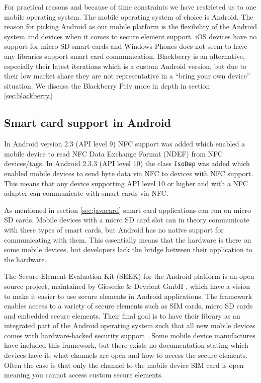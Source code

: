 For practical reasons and because of time constraints we have restricted us to one mobile operating system. The mobile operating system of choice is Android. The reason for picking Android as our mobile platform is the flexibility of the Android system and devices when it comes to secure element support. iOS devices have no support for micro SD smart cards and Windows Phones does not seem to have any libraries support smart card communication. Blackberry is an alternative, especially their latest iterations which is a custom Android version, but due to their low market share they are not representative in a ``bring your own device'' situation. We discuss the Blackberry Priv more in depth in section \ref{sec:blackberry.}


\subsection{Smart card support in Android}
\label{sec:supportAndroid}
In Android version 2.3 (API level 9) NFC support was added which enabled a mobile device to read NFC Data Exchange Format (NDEF) from NFC devices/tags. In Android 2.3.3 (API level 10) the class \texttt{IsoDep} was added which enabled mobile devices to send byte data via NFC to devices with NFC support. This means that any device supporting API level 10 or higher and with a NFC adapter can communicate with smart cards via NFC.

As mentioned in section \ref{sec:javacard} smart card applications can run on micro SD cards. Mobile devices with a micro SD card slot can in theory communicate with these types of smart cards, but Android has no native support for communicating with them. This essentially means that the hardware is there on some mobile devices, but developers lack the bridge between their application to the hardware.

The Secure Element Evaluation Kit (SEEK) for the Android platform is an open source project, maintained by Giesecke \& Devrient GmbH \cite{Giesecke}, which have a vision to make it easier to use secure elements in Android applications. The framework enables access to a variety of secure elements such as SIM cards, micro SD cards and embedded secure elements. Their final goal is to have their library as an integrated part of the Android operating system such that all new mobile devices comes with hardware-backed security support \cite{SEEK}. Some mobile device manufactures have included this framework, but there exists no documentation stating which devices have it, what channels are open and how to access the secure elements. Often the case is that only the channel to the mobile device SIM card is open meaning you cannot access custom secure elements.

